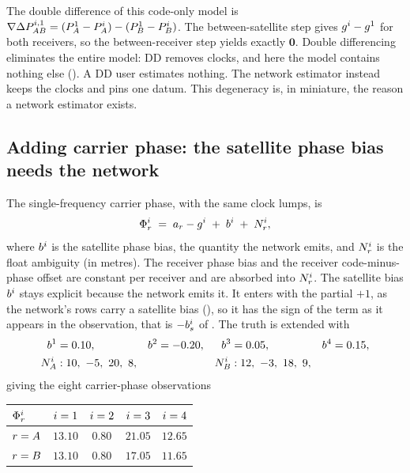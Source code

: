 \documentclass[main.tex]{subfiles}
\begin{document}
\begin{remark}
The double difference of this code-only model is
$\nabla\Delta P^{i,1}_{AB} = (P^1_A - P^i_A) - (P^1_B -
P^i_B)$. The between-satellite step gives $g^i - g^1$ for both
receivers, so the between-receiver step yields exactly $\bm{0}$. Double
differencing eliminates the entire model: DD removes clocks, and here the
model contains nothing else
(). A DD user estimates
nothing. The network estimator instead keeps the clocks and pins one
datum. This degeneracy is, in miniature, the reason a network estimator
exists.
\end{remark}

\subsection{Adding carrier phase: the satellite phase bias needs the network}
\label{sec:net-example-phase}

The single-frequency carrier phase, with the same clock lumps, is
\begin{equation}
\Phi^i_r \;=\; a_r - g^i \;+\; b^i \;+\; N^i_r,
\label{eq:ex-phase-model}
\end{equation}
where $b^i$ is the satellite phase bias, the quantity the network
emits, and $N^i_r$ is the float ambiguity (in metres). The receiver
phase bias and the receiver code-minus-phase offset are constant per
receiver and are absorbed into $N^i_r$. The satellite bias $b^i$
stays explicit because the network emits it. It enters with the partial
$+1$, as the network's rows carry a satellite bias
(), so it has the sign of
the term as it appears in the observation, that is $-b^i_s$ of
. The truth is extended
with
\begin{align*}
b^1 &= 0.10, & b^2 &= -0.20, & b^3 &= 0.05, & b^4 &= 0.15, \\
N^\sat_A &: 10,\ -5,\ 20,\ 8, & & & N^\sat_B &: 12,\ -3,\ 18,\ 9, & &
\end{align*}
giving the eight carrier-phase observations
\begin{center}
\begin{tabular}{@{}lcccc@{}}
\toprule
$\Phi^i_r$ & $i=1$ & $i=2$ & $i=3$ & $i=4$ \\
\midrule
$r = A$ & $13.10$ & $0.80$ & $21.05$ & $12.65$ \\
$r = B$ & $13.10$ & $0.80$ & $17.05$ & $11.65$ \\
\bottomrule
\end{tabular}
\end{center}
\end{document}
